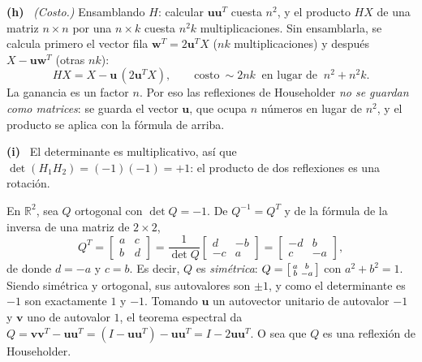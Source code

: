 \documentclass[11pt,a4paper]{article}
\newcommand{\bi}[1]{\boldsymbol{#1}}
\newcommand{\R}{\mathbb{R}}
\newcommand{\bu}{\bi{u}}  \newcommand{\bv}{\bi{v}}  \newcommand{\bw}{\bi{w}}
\newcommand{\itemsol}[1]{\par\medskip\noindent\textbf{(#1)}\ \ignorespaces}
\begin{document}
\itemsol{h} \emph{(Costo.)} Ensamblando $H$: calcular $\bu\bu^T$ cuesta $n^2$, y
el producto $HX$ de una matriz $n\times n$ por una $n\times k$ cuesta $n^2k$
multiplicaciones. Sin ensamblarla, se calcula primero el vector fila
$\bw^T=2\bu^TX$ ($nk$ multiplicaciones) y después $X-\bu\bw^T$ (otras $nk$):
\[
HX=X-\bu\,(2\bu^TX),\qquad
\text{costo}\ \sim 2nk\ \text{ en lugar de }\ n^2+n^2k .
\]
La ganancia es un factor $n$. Por eso las reflexiones de Householder \emph{no se
guardan como matrices}: se guarda el vector $\bu$, que ocupa $n$ números en
lugar de $n^2$, y el producto se aplica con la fórmula de arriba.

\itemsol{i} El determinante es multiplicativo, así que
$\det(H_1H_2)=(-1)(-1)=+1$: el producto de dos reflexiones es una rotación.

En $\R^2$, sea $Q$ ortogonal con $\det Q=-1$. De $Q^{-1}=Q^T$ y de la fórmula de
la inversa de una matriz de $2\times2$,
\[
Q^T=\begin{bmatrix}a&c\\ b&d\end{bmatrix}
=\frac{1}{\det Q}\begin{bmatrix}d&-b\\ -c&a\end{bmatrix}
=\begin{bmatrix}-d&b\\ c&-a\end{bmatrix},
\]
de donde $d=-a$ y $c=b$. Es decir, $Q$ es \emph{simétrica}:
$Q=\begin{bsmallmatrix}a&b\\b&-a\end{bsmallmatrix}$ con $a^2+b^2=1$. Siendo
simétrica y ortogonal, sus autovalores son $\pm1$, y como el determinante es
$-1$ son exactamente $1$ y $-1$. Tomando $\bu$ un autovector unitario de
autovalor $-1$ y $\bv$ uno de autovalor $1$, el teorema espectral da
$Q=\bv\bv^T-\bu\bu^T=(I-\bu\bu^T)-\bu\bu^T=I-2\bu\bu^T$. O sea que $Q$ es una
reflexión de Householder.
\end{document}
